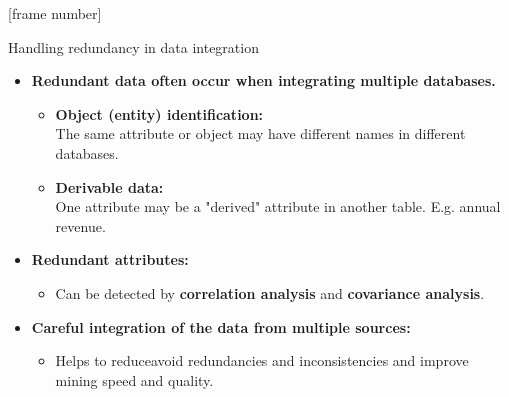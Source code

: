 \documentclass[aspectratio=169,t]{beamer}
\begin{document}
  {
    [frame number]
    \begin{frame}{Handling redundancy in data integration}
    \begin{itemize}
      \item \textbf{Redundant data often occur when integrating multiple databases.}
      \begin{itemize}
        \item \textbf{Object (entity) identification:} \\
              The same attribute or object may have different names in different databases.
        \item \textbf{Derivable data:}\\
              One attribute may be a "derived" attribute in another table. E.g. annual revenue.
      \end{itemize}
      \item \textbf{Redundant attributes:}
      \begin{itemize}
        \item Can be detected by \textbf{\color{airforceblue}correlation analysis} and \textbf{\color{airforceblue}covariance analysis}.
      \end{itemize}
      \item \textbf{Careful integration of the data from multiple sources:}
      \begin{itemize}
        \item Helps to reduce\/avoid redundancies and inconsistencies and improve mining speed and quality.
      \end{itemize}
    \end{itemize}
    \end{frame}
  }
\end{document}
